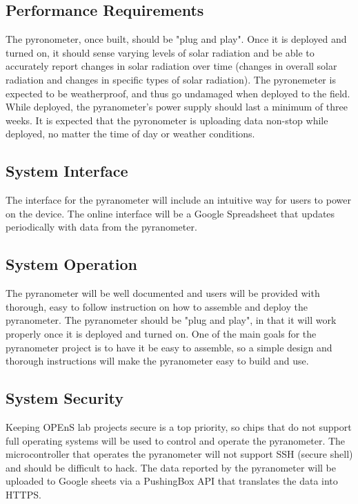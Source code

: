 \documentclass[10pt,draftclsnofoot,onecolumn,letterpaper]{article}
\begin{document}
\subsection{Performance Requirements}The pyronometer, once built, should be "plug and play". Once it is deployed and turned on, it should sense varying levels of solar radiation and be able to accurately report changes in solar radiation over time (changes in overall solar radiation and changes in specific types of solar radiation). The pyronemeter is expected to be weatherproof, and thus go undamaged when deployed to the field. While deployed, the pyranometer's power supply should last a minimum of three weeks. It is expected that the pyronometer is uploading data non-stop while deployed, no matter the time of day or weather conditions.

\subsection{System Interface}
The interface for the pyranometer will include an intuitive way for users to power on the device. The online interface will be a Google Spreadsheet that updates periodically with data from the pyranometer.

\subsection{System Operation}
The pyranometer will be well documented and users will be provided with thorough, easy to follow instruction on how to assemble and deploy the pyranometer. The pyranometer should be "plug and play", in that it will work properly once it is deployed and turned on. One of the main goals for the pyranometer project is to have it be easy to assemble, so a simple design and thorough instructions will make the pyranometer easy to build and use.

\subsection{System Security}
Keeping OPEnS lab projects secure is a top priority, so chips that do not support full operating systems will be used to control and operate the pyranometer. The microcontroller that operates the pyranometer will not support SSH (secure shell) and should be difficult to hack. The data reported by the pyranometer will be uploaded to Google sheets via a PushingBox API that translates the data into HTTPS.
\end{document}
